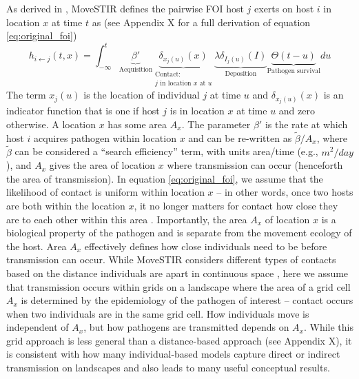 \documentclass[letterpaper]{article}
\begin{document}
As derived in \cite{Wilber2022}, MoveSTIR defines the pairwise FOI host $j$ exerts on host $i$ in location $x$ at time $t$ as \citep{Wilber2022} (see Appendix X for a full derivation of equation \ref{eq:original_foi})
\begin{equation}
    h_{i \leftarrow j}(t, x) = \int_{-\infty}^{t} \underbrace{\beta'}_{\text{Acquisition}} \underbrace{\delta_{x_j(u)}(x)}_{\substack{\text{Contact:} \\ \text{$j$ in location $x$ at $u$}}}  \underbrace{\lambda \delta_{I_j(u)}(I)}_{\text{Deposition}} \underbrace{\Theta(t - u)}_{\text{Pathogen survival}} du
    \label{eq:original_foi}
\end{equation}
The term $x_j(u)$ is the location of individual $j$ at time $u$ and $\delta_{x_j(u)}(x)$ is an indicator function that is one if host $j$ is in location $x$ at time $u$ and zero otherwise. A location $x$ has some area $A_x$.  The parameter $\beta'$ is the rate at which host $i$ acquires pathogen within location $x$ and can be re-written as $\tilde{\beta} / A_x$, where $\tilde{\beta}$ can be considered a ``search efficiency'' term, with units area/time (e.g., $m^2 / day$), and $A_x$ gives the area of location $x$ where transmission can occur (henceforth the area of transmission). In equation \ref{eq:original_foi}, we assume that the likelihood of contact is uniform within location $x$ -- in other words, once two hosts are both within the location $x$, it no longer matters for contact how close they are to each other within this area \citep{Gurarie2013,Wilber2022}. Importantly, the area $A_x$ of location $x$ is a biological property of the pathogen and is separate from the movement ecology of the host. Area $A_x$ effectively defines how close individuals need to be before transmission can occur. While MoveSTIR considers different types of contacts based on the distance individuals are apart in continuous space \citep{Wilber2022}, here we assume that transmission occurs within grids on a landscape where the area of a grid cell $A_x$ is determined by the epidemiology of the pathogen of interest -- contact occurs when two individuals are in the same grid cell. How individuals move is independent of $A_x$, but how pathogens are transmitted depends on $A_x$.  While this grid approach is less general than a distance-based approach (see Appendix X), it is consistent with how many individual-based models capture direct or indirect transmission on landscapes \citep[e.g.][]{White2018e,Thompson2024} and also leads to many useful conceptual results.  
\end{document}
